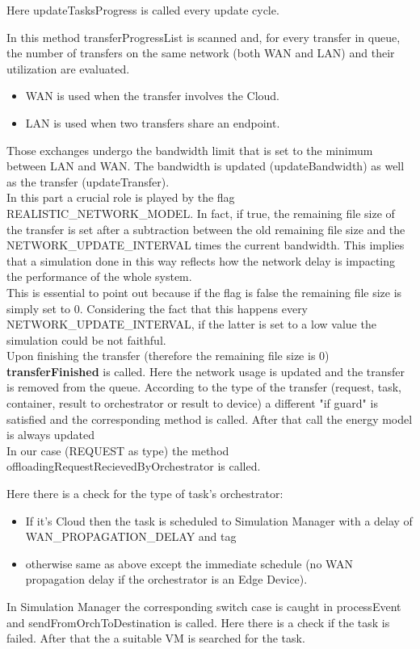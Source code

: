 \documentclass[12pt]{report}
\begin{document}
Here updateTasksProgress is called every update cycle.

In this method transferProgressList is scanned and, for every transfer in queue, the number of transfers on the same network (both WAN and LAN) and their utilization are evaluated.
\begin{itemize}
	\item WAN is used when the transfer involves the Cloud.
	\item LAN is used when two transfers share an endpoint.
\end{itemize}
Those exchanges undergo the bandwidth limit that is set to the minimum between LAN and WAN.
The bandwidth is updated (updateBandwidth) as well as the transfer (updateTransfer).\\
In this part a crucial role is played by the flag REALISTIC\_NETWORK\_MODEL. In fact, if true, the remaining file size of the transfer is set after a subtraction between the old remaining file size and the NETWORK\_UPDATE\_INTERVAL times the current bandwidth. This implies that a simulation done in this way reflects how the network delay is impacting the performance of the whole system.\\
This is essential to point out because if the flag is false the remaining file size is simply set to 0. Considering the fact that this happens every NETWORK\_UPDATE\_INTERVAL, if the latter is set to a low value the simulation could be not faithful.\\
Upon finishing the transfer (therefore the remaining file size is 0) \textbf{transferFinished} is called.
Here the network usage is updated and the transfer is removed from the queue.
According to the type of the transfer (request, task, container, result to orchestrator or result to device) a different "if guard" is satisfied and the corresponding method is called. After that call the energy model is always updated\\
In our case (REQUEST as type) the method offloadingRequestRecievedByOrchestrator is called.

Here there is a check for the type of task's orchestrator:
\begin{itemize}
	\item If it's Cloud then the task is scheduled to Simulation Manager with a delay of WAN\_PROPAGATION\_DELAY and tag 
	\item otherwise same as above except the immediate schedule (no WAN propagation delay if the orchestrator is an Edge Device).
\end{itemize}
\vspace{0.5cm}
In Simulation Manager the corresponding switch case is caught in processEvent and sendFromOrchToDestination is called.
Here there is a check if the task is failed. After that the a suitable VM is searched for the task.
\end{document}
